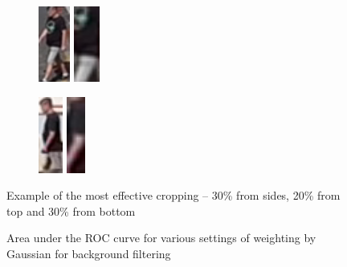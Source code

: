 \begin{figure}
    \centering
     \begin{subfigure}[b]{0.49\textwidth}
         \centering
         \includegraphics[height=2.5cm]{img/0.png}
         \includegraphics[height=2.5cm]{img/0_crop.png}
     \end{subfigure}
     \hfill
      \begin{subfigure}[b]{0.49\textwidth}
         \centering
         \includegraphics[height=2.5cm]{img/1.png}
         \includegraphics[height=2.5cm]{img/1_crop.png}
     \end{subfigure}
    \caption[Example of the most effective cropping]{Example of the most effective cropping -- 30\% from sides, 20\% from top and 30\% from bottom}
    \label{fig:best_cropping}
\end{figure}

\begin{figure}
    \centering
    \def\svgwidth{\columnwidth}
    \Large
    \scalebox{0.6}{}
    \caption{Area under the ROC curve for various settings of weighting by Gaussian for background filtering}
    \label{fig:aoc_gauss}
\end{figure}

